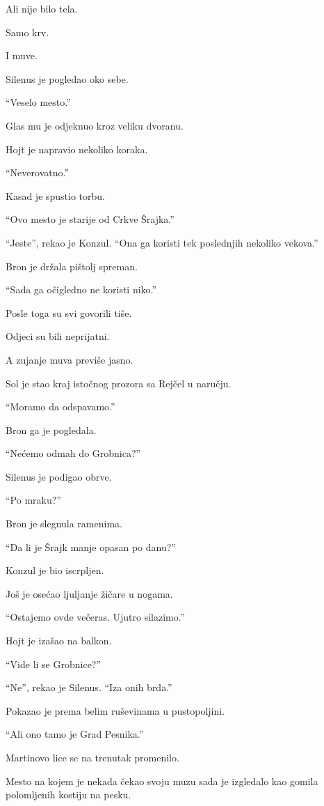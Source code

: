 Ali nije bilo tela.

Samo krv.

I muve.

\bigskip

Silenus je pogledao oko sebe.

``Veselo mesto.''

Glas mu je odjeknuo kroz veliku dvoranu.

Hojt je napravio nekoliko koraka.

``Neverovatno.''

Kasad je spustio torbu.

``Ovo mesto je starije od Crkve Šrajka.''

``Jeste'', rekao je Konzul. ``Ona ga koristi tek poslednjih nekoliko vekova.''

Bron je držala pištolj spreman.

``Sada ga očigledno ne koristi niko.''

Posle toga su svi govorili tiše.

Odjeci su bili neprijatni.

A zujanje muva previše jasno.

\bigskip

Sol je stao kraj istočnog prozora sa Rejčel u naručju.

``Moramo da odspavamo.''

Bron ga je pogledala.

``Nećemo odmah do Grobnica?''

Silenus je podigao obrve.

``Po mraku?''

Bron je slegnula ramenima.

``Da li je Šrajk manje opasan po danu?''

Konzul je bio iscrpljen.

Još je osećao ljuljanje žičare u nogama.

``Ostajemo ovde večeras. Ujutro silazimo.''

\bigskip

Hojt je izašao na balkon.

``Vide li se Grobnice?''

``Ne'', rekao je Silenus. ``Iza onih brda.''

Pokazao je prema belim ruševinama u pustopoljini.

``Ali ono tamo je Grad Pesnika.''

Martinovo lice se na trenutak promenilo.

Mesto na kojem je nekada čekao svoju muzu sada je izgledalo kao gomila polomljenih kostiju na pesku.

